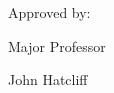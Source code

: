     \begin{flushright}
    Approved by:\\
    \vspace{0.3cm}
    \begin{singlespace}
    Major Professor



    John Hatcliff\\
    \end{singlespace}
    \end{flushright}


